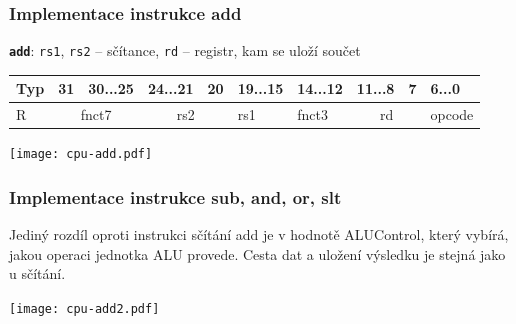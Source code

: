 \documentclass{beamer}
\begin{document}
\begin{frame}[shrink=25]
\frametitle{Implementace instrukce add}

\textbf{\texttt{add}}: \texttt{rs1}, \texttt{rs2} -- sčítance, \texttt{rd} -- registr, kam se uloží součet

\bigskip

\begin{table}
\footnotesize
\begin{tabular}{|m{0.4cm}|m{0.4cm}|m{1.0cm}|m{1.0cm}|m{0.4cm}|m{1.0cm}|m{1.0cm}|m{1.0cm}|m{0.4cm}|m{1.0cm}|}\hline
Typ & 31 & 30...25 & 24...21 & 20 & 19...15 & 14...12 & 11...8 & 7 & 6...0 \\ \hline
R & \multicolumn{2}{c|}{ fnct7 } & \multicolumn{2}{c|}{ rs2 } & rs1 & fnct3 &\multicolumn{2}{c|}{ rd } & opcode\\ \hline
\end{tabular}
\end{table}

\bigskip

\texttt{[image: cpu-add.pdf]}

\end{frame}


\begin{frame}
\frametitle{Implementace instrukce sub, and, or, slt}

Jediný rozdíl oproti instrukci sčítání add je v hodnotě ALUControl, který vybírá, jakou operaci jednotka ALU provede. Cesta dat a uložení výsledku je stejná jako u sčítání.
\bigskip

\bigskip

\texttt{[image: cpu-add2.pdf]}

\end{frame}
\end{document}
